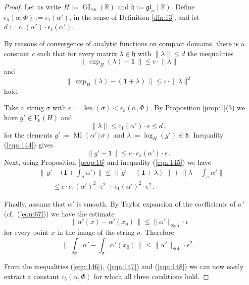 \documentclass[10pt, a4paper]{amsart}
\theoremstyle{definition}
\numberwithin{equation}{section}
\newcommand{\opn}{\operatorname}
\newcommand{\mfrak}[1]{\mathfrak{#1}}
\newcommand{\mrm}[1]{\mathrm{#1}}
\newcommand{\mbb}[1]{\mathbb{#1}}
\newcommand{\bsym}[1]{\boldsymbol{#1}}
\newcommand{\norm}[1]{\lVert #1 \rVert}
\newcommand{\Norm}[1]{\bigl\lVert\, #1 \, \bigr\rVert}
\renewcommand{\vert}{\, | \,}
\newcommand{\R}{\mbb{R}}
\newcommand{\h}{\mfrak{h}}
\begin{document}
\begin{proof}
Let us write $H := \opn{GL}_m(\R)$ and
$\h := \mfrak{gl}_n(\R)$. 
Define $\epsilon_5(\alpha, \Phi) := \epsilon_1(\alpha')$, in the sense of
Definition \ref{dfn:13}, and let
$d := c_1(\alpha') \cdot \epsilon_1(\alpha')$.

By reasons of convergence of analytic functions on compact domains,
there is a constant $c$ such that 
for every matrix $\lambda \in \h$ with 
$\norm{\lambda} \leq d$ the inequalities
\begin{equation} \label{eqn:144}
\Norm{ \exp_H(\lambda) - \bsym{1} } \leq c \cdot \norm{\lambda}
\end{equation}
and
\begin{equation} \label{eqn:145}
\Norm{ \exp_H(\lambda) - (\bsym{1} + \lambda) } \leq c \cdot \norm{\lambda}^2 
\end{equation}
hold. 

Take a string $\sigma$ with 
$\epsilon := \opn{len}(\sigma) < \epsilon_5(\alpha, \Phi)$.
By Proposition \ref{prop:1}(3) we have
$g' \in V_0(H)$ and 
\[ \norm{\lambda} \leq c_1(\alpha') \cdot \epsilon \leq  d \, , \]
for the elements
$g' := \opn{MI}(\alpha' \vert \sigma)$ and
$\lambda := \log_H(g') \in \h$.
Inequality (\ref{eqn:144}) gives
\begin{equation} \label{eqn:146}
\norm{ g' - \bsym{1} } \leq c \cdot  c_1(\alpha') \cdot \epsilon 
\, . 
\end{equation}
Next,  using Proposition \ref{prop:16} and
inequality (\ref{eqn:145}) we have 
\begin{equation} \label{eqn:147}
\begin{aligned}
& \Norm{ g' - \bigl( \bsym{1} + \int_{\sigma} \alpha' \bigr) } \leq 
\Norm{ g' - (\bsym{1} + \lambda) } +
\norm{ \lambda - \int_{\sigma} \alpha' } \\
& \qquad \leq c \cdot c_1(\alpha')^2  \cdot \epsilon^2
+  c_1(\alpha')^2 \cdot \epsilon^2 \, . 
\end{aligned}
\end{equation}

Finally, assume that $\alpha'$ is smooth. By Taylor expansion of the
coefficients of $\alpha'$ (cf.\ (\ref{eqn:67})) we have the estimate
\[ \Norm{ \alpha'(x) - \alpha'(x_0) } \leq \norm{ \alpha' }_{\mrm{Sob}} \cdot 
\epsilon \]
for every point $x$ in the image of the string $\sigma$. 
Therefore
\begin{equation} \label{eqn:148}
\Norm{ \int_{\sigma} \alpha' - \int_{\sigma} \alpha'(x_0) } \leq
\norm{ \alpha' }_{\mrm{Sob}} \cdot \epsilon^2 \, .
\end{equation}

{}From the inequalities (\ref{eqn:146}), (\ref{eqn:147}) and (\ref{eqn:148})
we can now easily extract a constant $c_5(\alpha, \Phi)$ for which all three
conditions hold.
\end{proof}
\end{document}
